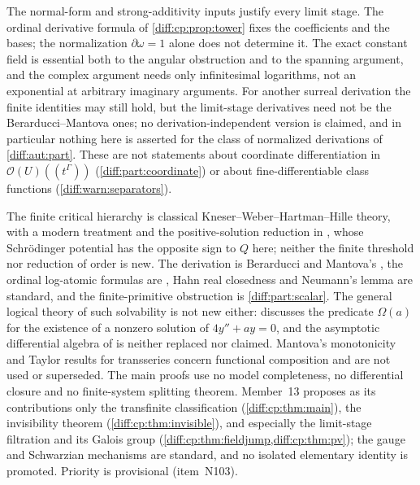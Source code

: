 \documentclass[11pt,letterpaper]{article}
\numberwithin{equation}{section}
\theoremstyle{definition}
\theoremstyle{remark}
\newcommand{\der}{\partial}
\newcommand{\Hol}{\mathscr O}
\begin{document}
\begin{remark}
\label{diff:cp:rem:derivation}
The normal-form and strong-additivity inputs justify every limit stage. The
ordinal derivative formula of \cref{diff:cp:prop:tower} fixes the coefficients
and the bases; the normalization $\der\omega=1$ alone does not determine it.
The exact constant field is essential both to the angular obstruction and to
the spanning argument, and the complex argument needs only infinitesimal
logarithms, not an exponential at arbitrary imaginary arguments. For another
surreal derivation the finite identities may still hold, but the limit-stage
derivatives need not be the Berarducci--Mantova ones; no derivation-independent
version is claimed, and in particular nothing here is asserted for the class
of normalized derivations of \cref{diff:aut:part}. These are not statements
about coordinate differentiation in $\Hol(U)((t^{\Gamma}))$
(\cref{diff:part:coordinate}) or about fine-differentiable class functions
(\cref{diff:warn:separators}).
\end{remark}

\begin{remark}
\label{diff:cp:rem:inputs}
The finite critical hierarchy is classical Kneser--Weber--Hartman--Hille
theory, with a modern treatment and the positive-solution reduction in
\cite[Section~2]{KT}, whose Schr\"odinger potential has the opposite sign to
$Q$ here; neither the finite threshold nor reduction of order is new. The
derivation is Berarducci and Mantova's \cite{BM}, the ordinal log-atomic
formulas are \cite[Section~2]{ADH}, Hahn real closedness and Neumann's lemma are
standard, and the finite-primitive obstruction is \cref{diff:part:scalar}. The
general logical theory of such solvability is not new either:
\cite[p.~17]{ADH} discusses the predicate $\Omega(a)$ for the existence of a
nonzero solution of $4y''+ay=0$, and the asymptotic differential algebra of
\cite{ADHBook} is neither replaced nor claimed. Mantova's monotonicity and
Taylor results for transseries \cite{Mantova2026} concern functional
composition and are not used or superseded. The main proofs use no model
completeness, no differential closure and no finite-system splitting theorem.
Member~13 proposes as its contributions only the transfinite classification
(\cref{diff:cp:thm:main}), the invisibility theorem
(\cref{diff:cp:thm:invisible}), and especially the limit-stage filtration and
its Galois group (\cref{diff:cp:thm:fieldjump,diff:cp:thm:pv}); the gauge and Schwarzian mechanisms
are standard, and no isolated elementary identity is promoted. Priority is
provisional (item~N103).
\end{remark}
\end{document}
